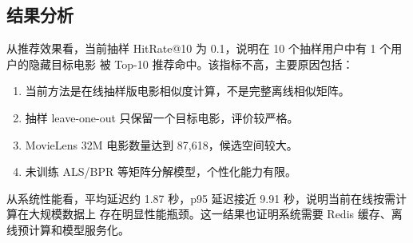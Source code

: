 \subsection{结果分析}

从推荐效果看，当前抽样 HitRate@10 为 0.1，说明在 10 个抽样用户中有 1 个用户的隐藏目标电影
被 Top-10 推荐命中。该指标不高，主要原因包括：

\begin{enumerate}[leftmargin=2em]
  \item 当前方法是在线抽样版电影相似度计算，不是完整离线相似矩阵。
  \item 抽样 leave-one-out 只保留一个目标电影，评价较严格。
  \item MovieLens 32M 电影数量达到 87{,}618，候选空间较大。
  \item 未训练 ALS/BPR 等矩阵分解模型，个性化能力有限。
\end{enumerate}

从系统性能看，平均延迟约 1.87 秒，p95 延迟接近 9.91 秒，说明当前在线按需计算在大规模数据上
存在明显性能瓶颈。这一结果也证明系统需要 Redis 缓存、离线预计算和模型服务化。

\newpage

